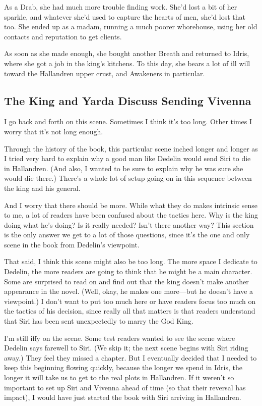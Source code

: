 As a Drab, she had much more trouble finding work. She’d lost a bit of her sparkle, and whatever she’d used to capture the hearts of men, she’d lost that too. She ended up as a madam, running a much poorer whorehouse, using her old contacts and reputation to get clients.

As soon as she made enough, she bought another Breath and returned to Idris, where she got a job in the king’s kitchens. To this day, she bears a lot of ill will toward the Hallandren upper crust, and Awakeners in particular.

\subsection*{The King and Yarda Discuss Sending Vivenna}

I go back and forth on this scene. Sometimes I think it’s too long. Other times I worry that it’s not long enough.

Through the history of the book, this particular scene inched longer and longer as I tried very hard to explain why a good man like Dedelin would send Siri to die in Hallandren. (And also, I wanted to be sure to explain why he was sure she would die there.) There’s a whole lot of setup going on in this sequence between the king and his general.

And I worry that there should be more. While what they do makes intrinsic sense to me, a lot of readers have been confused about the tactics here. Why is the king doing what he’s doing? Is it really needed? Isn’t there another way? This section is the only answer we get to a lot of those questions, since it’s the one and only scene in the book from Dedelin’s viewpoint.

That said, I think this scene might also be too long. The more space I dedicate to Dedelin, the more readers are going to think that he might be a main character. Some are surprised to read on and find out that the king doesn’t make another appearance in the novel. (Well, okay, he makes one more—but he doesn’t have a viewpoint.) I don’t want to put too much here or have readers focus too much on the tactics of his decision, since really all that matters is that readers understand that Siri has been sent unexpectedly to marry the God King.

I’m still iffy on the scene. Some test readers wanted to see the scene where Dedelin says farewell to Siri. (We skip it; the next scene begins with Siri riding away.) They feel they missed a chapter. But I eventually decided that I needed to keep this beginning flowing quickly, because the longer we spend in Idris, the longer it will take us to get to the real plots in Hallandren. If it weren’t so important to set up Siri and Vivenna ahead of time (so that their reversal has impact), I would have just started the book with Siri arriving in Hallandren.



